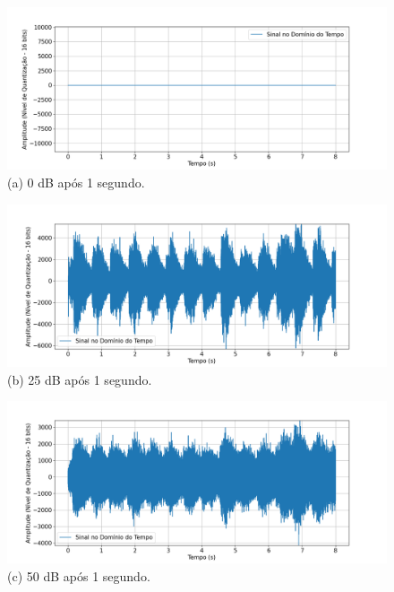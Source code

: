 \begin{figure}[htpb]
    \centering
    \begin{minipage}[b]{0.7\textwidth}
        \centering
        \includegraphics[width=\textwidth]{figuras/fig70.png}
        \vspace{0.3cm} %
        (a) 0 dB após 1 segundo.
    \end{minipage}
    \hspace{0.5cm} %

    \begin{minipage}[b]{0.7\textwidth}
        \centering
        \includegraphics[width=\textwidth]{figuras/fig71.png}
        \vspace{0.3cm} %
        (b) 25 dB após 1 segundo.
    \end{minipage}
    
    \vspace{0.5cm} %

    \begin{minipage}[b]{0.7\textwidth}
        \centering
        \includegraphics[width=\textwidth]{figuras/fig72.png}
        \vspace{0.3cm} %
        (c) 50 dB após 1 segundo.
    \end{minipage}
    \hspace{0.5cm} %


\end{figure}
